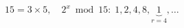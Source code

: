 \documentclass[border=6pt]{standalone}
\begin{document}
\color{ptitnavy}
\(\displaystyle 15=3\times5,\quad 2^x\bmod 15:\;1,2,4,8,\underbrace{1}_{r=4},\ldots\)
\end{document}
